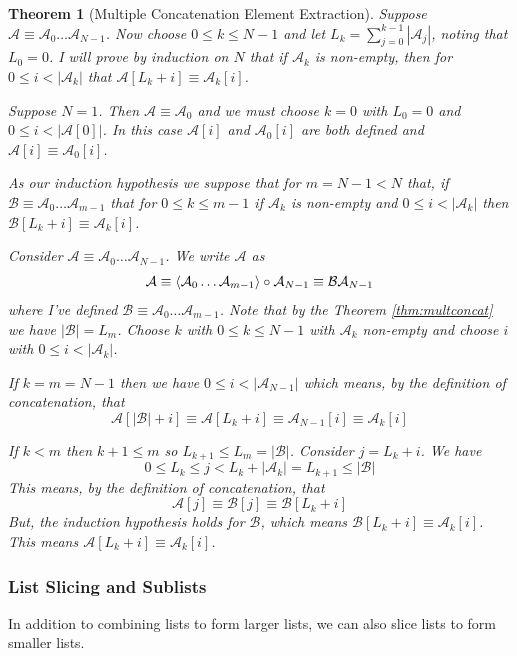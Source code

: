 \documentclass[12pt]{article}
\theoremstyle{break}
\theoremstyle{break}
\newtheorem{theorem}{Theorem}[section]
\theoremstyle{break}
\theoremstyle{break}
\newcommand{\mc}[1]{\mathcal{#1}}
\begin{document}
\begin{theorem}[Multiple Concatenation Element Extraction]
\label{thm:multconcatextract}
Suppose $\mc{A} \equiv \mc{A}_0\ldots\mc{A}_{N-1}$.
Now choose $0\le k \le N-1$ and let $L_k = \sum_{j=0}^{k-1} |\mc{A}_j|$, noting that $L_0=0$.
I will prove by induction on $N$ that if $\mc{A}_k$ is non-empty, then for $0 \le i < |\mc{A}_k|$ that $\mc{A}[L_k + i] \equiv \mc{A}_k[i]$.

Suppose $N=1$.
Then $\mc{A} \equiv \mc{A}_0$ and we must choose $k=0$ with $L_0=0$ and $0 \le i < |\mc{A}[0]|$.
In this case $\mc{A}[i]$ and $\mc{A}_0[i]$ are both defined and $\mc{A}[i] \equiv \mc{A}_0[i]$.

As our induction hypothesis we suppose that for $m = N-1 < N$ that, if $\mc{B}\equiv \mc{A}_0 \ldots \mc{A}_{m-1}$ that for $0\le k \le m-1$ if $\mc{A}_k$ is non-empty and $0 \le i < |\mc{A}_k|$ then $\mc{B}[L_k+i] \equiv \mc{A}_k[i]$.

Consider $\mc{A} \equiv \mc{A}_0 \ldots \mc{A}_{N-1}$.
We write $\mc{A}$ as
\begin{align*}
\mc{A} \equiv \Braket{\mc{A}_0\ldots \mc{A}_{m-1}} \circ \mc{A}_{N-1} \equiv \mc{B}\mc{A}_{N-1}
\end{align*}
where I've defined $\mc{B} \equiv \mc{A}_0 \ldots \mc{A}_{m-1}$.
Note that by the Theorem \ref{thm:multconcat} we have $|\mc{B}| = L_m$.
Choose $k$ with $0 \le k \le N-1$ with $\mc{A}_k$ non-empty and choose $i$ with $0 \le i < |\mc{A}_k|$.

If $k=m=N-1$ then we have $0\le i < |\mc{A}_{N-1}|$ which means, by the definition of concatenation, that
$$
\mc{A}[|\mc{B}|+i] \equiv \mc{A}[L_k+i] \equiv \mc{A}_{N-1}[i] \equiv \mc{A}_k[i]
$$

If $k < m$ then $k+1 \le m$ so $L_{k+1} \le L_m = |\mc{B}|$.
Consider $j = L_k + i$.
We have 
$$
0\le L_k \le j < L_k + |\mc{A}_k| = L_{k+1} \le |\mc{B}|
$$
This means, by the definition of concatenation, that
$$
\mc{A}[j] \equiv \mc{B}[j] \equiv \mc{B}[L_k + i]
$$
But, the induction hypothesis holds for $\mc{B}$, which means $\mc{B}[L_k+i] \equiv \mc{A}_k[i]$.
This means $\mc{A}[L_k+i] \equiv \mc{A}_k[i]$.

\end{theorem}

\subsubsection{List Slicing and Sublists}
In addition to combining lists to form larger lists, we can also slice lists to form smaller lists.
\end{document}
